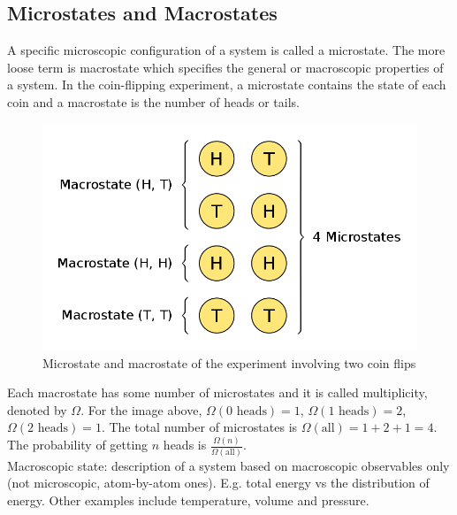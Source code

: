 \documentclass[12pt, a4paper]{article}
\newcounter{exa}
\begin{document}
\subsection{Microstates and Macrostates}

A specific microscopic configuration of a system is called a microstate. The more loose term is macrostate which specifies the general or macroscopic properties of a system. In the coin-flipping experiment, a microstate contains the state of each coin and a macrostate is the number of heads or tails.

\begin{figure}[H]
\centering
\includegraphics[width=120mm]{5.png}
\caption{Microstate and macrostate of the experiment involving two coin flips}
\end{figure}

Each macrostate has some number of microstates and it is called multiplicity, denoted by $\Omega$. For the image above, $\Omega(\text{0 heads})=1$, $\Omega(\text{1 heads})=2$, $\Omega(\text{2 heads})=1$. The total number of microstates is $\Omega(\text{all})=1+2+1=4$. The probability of getting $n$ heads is $\frac{\Omega(n)}{\Omega(\text{all})}$. \\

Macroscopic state: description of a system based on macroscopic observables only (not microscopic, atom-by-atom ones). E.g. total energy vs the distribution of energy. Other examples include temperature, volume and pressure.
\end{document}
